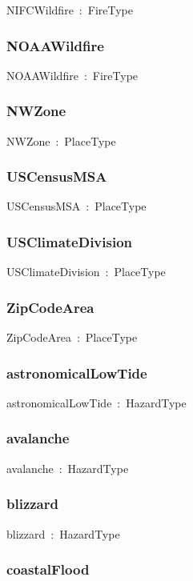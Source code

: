 \documentclass{article}
\begin{document}
NIFCWildfire~:~FireType

\subsubsection*{NOAAWildfire}

NOAAWildfire~:~FireType

\subsubsection*{NWZone}

NWZone~:~PlaceType

\subsubsection*{USCensusMSA}

USCensusMSA~:~PlaceType

\subsubsection*{USClimateDivision}

USClimateDivision~:~PlaceType

\subsubsection*{ZipCodeArea}

ZipCodeArea~:~PlaceType

\subsubsection*{astronomicalLowTide}

astronomicalLowTide~:~HazardType

\subsubsection*{avalanche}

avalanche~:~HazardType

\subsubsection*{blizzard}

blizzard~:~HazardType

\subsubsection*{coastalFlood}
\end{document}
